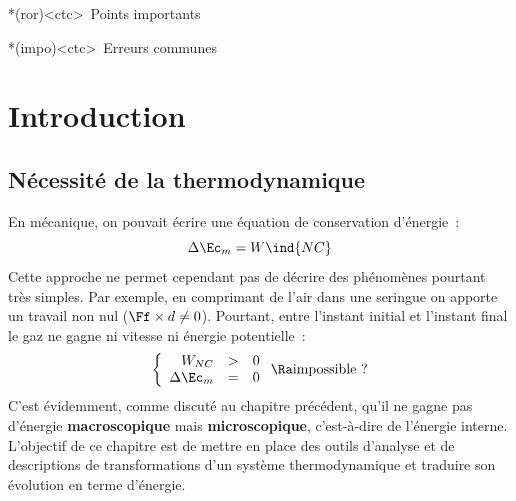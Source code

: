 \documentclass[../../main/main.tex]{subfiles}
\begin{document}
\begin{tcn}
	\begin{tcn}*(ror)<ctc>{\iconhart~Points importants}
	\end{tcn}
	\begin{tcn}*(impo)<ctc>{\iconimpo~Erreurs communes}
	\end{tcn}
\end{tcn}

\vspace*{\fill}
\newpage

\section{Introduction}
\subsection{Nécessité de la thermodynamique}
En mécanique, on pouvait écrire une équation de conservation d'énergie~:
\[
	\Delta{\Ec_m} = W\ind{NC}
\]
Cette approche ne permet cependant pas de décrire des phénomènes pourtant très
simples. Par exemple, en comprimant de l'air dans une seringue on apporte un
travail non nul ($\Ff \times d \neq 0$). Pourtant, entre l'instant initial et
l'instant final le gaz ne gagne ni vitesse ni énergie potentielle~:
\[
	\left\{
	\begin{array}{rcl}
		W_{NC}        & > & 0
		\\
		\Delta{\Ec_m} & = & 0
	\end{array}
	\right.
	\Ra
	\text{impossible~?}
\]
C'est évidemment, comme discuté au chapitre précédent, qu'il ne gagne pas
d'énergie \textbf{macroscopique} mais \textbf{microscopique}, c'est-à-dire de
l'énergie interne.
\bigbreak
L'objectif de ce chapitre est de mettre en place des outils d'analyse et de
descriptions de transformations d'un système thermodynamique et traduire son
évolution en terme d'énergie.
\end{document}
